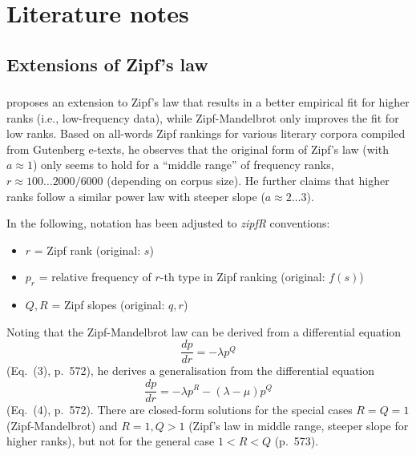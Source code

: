\documentclass[a4paper]{article}
\begin{document}
\section{Literature notes}
\label{sec:literature}

\subsection{Extensions of Zipf's law}
\label{sec:lit:extensions}

\subsubsection{\cite{Montemurro:01}}
\label{sec:lit:ext:Montemurro2001}

\citet{Montemurro:01} proposes an extension to Zipf's law that results in a better empirical fit for higher ranks (i.e., low-frequency data), while Zipf-Mandelbrot only improves the fit for low ranks.  Based on all-words Zipf rankings for various literary corpora compiled from Gutenberg e-texts, he observes that the original form of Zipf's law (with $a\approx 1$) only seems to hold for a ``middle range'' of frequency ranks, $r\approx 100 \ldots 2000 / 6000$ (depending on corpus size).  He further claims that higher ranks follow a similar power law with steeper slope ($a \approx 2 \ldots 3$).

In the following, notation has been adjusted to \emph{zipfR} conventions:
\begin{itemize}
\item $r$ = Zipf rank (original: $s$)
\item $p_r$ = relative frequency of $r$-th type in Zipf ranking (original: $f(s)$)
\item $Q, R$ = Zipf slopes (original: $q, r$) 
\end{itemize}

Noting that the Zipf-Mandelbrot law can be derived from a differential equation
\begin{equation}
  \label{eq:lit:ext:Montemurro2001:1}
  \frac{dp}{dr} = -\lambda p^Q
\end{equation}
(Eq.~(3), p.~572), he derives a generalisation from the differential equation
\begin{equation}
  \label{eq:lit:ext:Montemurro2001:2}
  \frac{dp}{dr} = -\lambda p^R - (\lambda - \mu) p^Q
\end{equation}
(Eq.~(4), p.~572).  There are closed-form solutions for the special cases $R = Q = 1$ (Zipf-Mandelbrot) and $R = 1, Q > 1$ (Zipf's law in middle range, steeper slope for higher ranks), but not for the general case $1 < R < Q$ (p.~573).  
\end{document}
